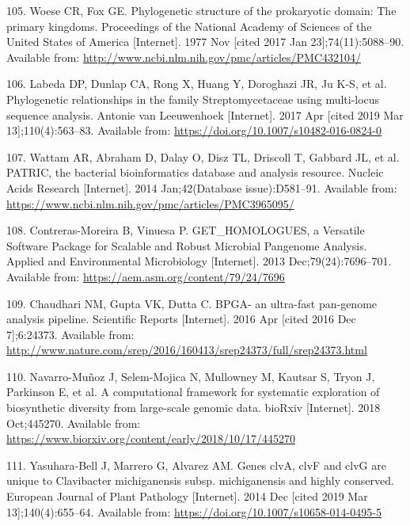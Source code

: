 \documentclass[12pt,twoside]{reedthesis}
\begin{document}
  \hypertarget{ref-woese_phylogenetic_1977}{}
  105. Woese CR, Fox GE. Phylogenetic structure of the prokaryotic domain:
  The primary kingdoms. Proceedings of the National Academy of Sciences of
  the United States of America {[}Internet{]}. 1977 Nov {[}cited 2017 Jan
  23{]};74(11):5088--90. Available from:
  \url{http://www.ncbi.nlm.nih.gov/pmc/articles/PMC432104/}
  
  \hypertarget{ref-labeda_phylogenetic_2017}{}
  106. Labeda DP, Dunlap CA, Rong X, Huang Y, Doroghazi JR, Ju K-S, et al.
  Phylogenetic relationships in the family Streptomycetaceae using
  multi-locus sequence analysis. Antonie van Leeuwenhoek {[}Internet{]}.
  2017 Apr {[}cited 2019 Mar 13{]};110(4):563--83. Available from:
  \url{https://doi.org/10.1007/s10482-016-0824-0}
  
  \hypertarget{ref-wattam_patric_2014}{}
  107. Wattam AR, Abraham D, Dalay O, Disz TL, Driscoll T, Gabbard JL, et
  al. PATRIC, the bacterial bioinformatics database and analysis resource.
  Nucleic Acids Research {[}Internet{]}. 2014 Jan;42(Database
  issue):D581--91. Available from:
  \url{https://www.ncbi.nlm.nih.gov/pmc/articles/PMC3965095/}
  
  \hypertarget{ref-contreras-moreira_get_homologues_2013}{}
  108. Contreras-Moreira B, Vinuesa P. GET\_HOMOLOGUES, a Versatile
  Software Package for Scalable and Robust Microbial Pangenome Analysis.
  Applied and Environmental Microbiology {[}Internet{]}. 2013
  Dec;79(24):7696--701. Available from:
  \url{https://aem.asm.org/content/79/24/7696}
  
  \hypertarget{ref-chaudhari_bpga-_2016}{}
  109. Chaudhari NM, Gupta VK, Dutta C. BPGA- an ultra-fast pan-genome
  analysis pipeline. Scientific Reports {[}Internet{]}. 2016 Apr {[}cited
  2016 Dec 7{]};6:24373. Available from:
  \url{http://www.nature.com/srep/2016/160413/srep24373/full/srep24373.html}
  
  \hypertarget{ref-navarro-munoz_computational_2018}{}
  110. Navarro-Muñoz J, Selem-Mojica N, Mullowney M, Kautsar S, Tryon J,
  Parkinson E, et al. A computational framework for systematic exploration
  of biosynthetic diversity from large-scale genomic data. bioRxiv
  {[}Internet{]}. 2018 Oct;445270. Available from:
  \url{https://www.biorxiv.org/content/early/2018/10/17/445270}
  
  \hypertarget{ref-yasuhara-bell_genes_2014}{}
  111. Yasuhara-Bell J, Marrero G, Alvarez AM. Genes clvA, clvF and clvG
  are unique to Clavibacter michiganensis subsp. michiganensis and highly
  conserved. European Journal of Plant Pathology {[}Internet{]}. 2014 Dec
  {[}cited 2019 Mar 13{]};140(4):655--64. Available from:
  \url{https://doi.org/10.1007/s10658-014-0495-5}
  
\end{document}
